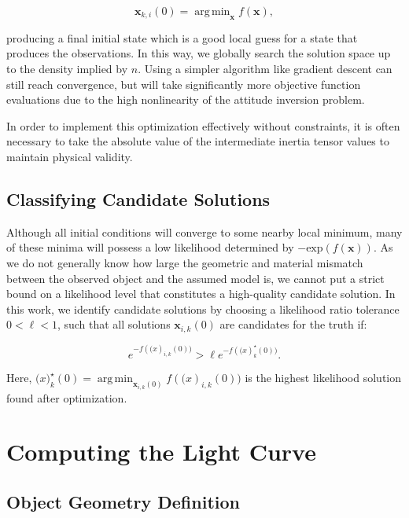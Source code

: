 \documentclass[a4paper,twocolumn]{spaceDebrisC} %
\newcommand{\vctr}[1]{\bm{#1}}
\DeclareMathOperator*{\argmin}{arg\,min}
\begin{document}
\begin{equation} \label{eq:opt_problem}
 \vctr{x}_{k,i}(0) = \argmin_{\vctr{x}} f(\vctr{x}),
\end{equation}

\noindent
producing a final initial state which is a good local guess for a state that produces the observations. In this way, we globally search the solution space up to the density implied by $n$. Using a simpler algorithm like gradient descent can still reach convergence, but will take significantly more objective function evaluations due to the high nonlinearity of the attitude inversion problem.

In order to implement this optimization effectively without constraints, it is often necessary to take the absolute value of the intermediate inertia tensor values to maintain physical validity. 

\subsection{Classifying Candidate Solutions} \label{sec:candidate_sols}

Although all initial conditions will converge to some nearby local minimum, many of these minima will possess a low likelihood determined by $-\mathrm{exp}(f(\vctr{x}))$. As we do not generally know how large the geometric and material mismatch between the observed object and the assumed model is, we cannot put a strict bound on a likelihood level that constitutes a high-quality candidate solution. In this work, we identify candidate solutions by choosing a likelihood ratio tolerance $0 < \ell < 1$, such that all solutions $\vctr{x}_{i,k}(0)$ are candidates for the truth if:

\begin{equation}
  e^{-f(\vctr(x)_{i,k}(0))} > \ell e^{-f(\vctr(x)^\star_{k}(0))}.
\end{equation}

Here, $\vctr(x)^\star_{k}(0) = \argmin_{\vctr{x}_{i,k}(0)} f(\vctr(x)_{i,k}(0)) $ is the highest likelihood solution found after optimization.

\section{Computing the Light Curve}

\subsection{Object Geometry Definition}
\end{document}
